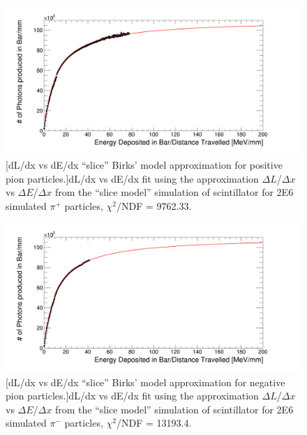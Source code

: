 \begin{figure}[htbp]
 \centering
 \includegraphics[width=\linewidth]{Appendix4/Figs/newNewDldxVsDeDx/pi+DeDxDlDx.png}
 [dL/dx vs dE/dx ``slice'' Birks' model approximation for positive pion particles.]{dL/dx vs dE/dx fit using the approximation $\Delta L$/$\Delta x$ vs $\Delta E$/$\Delta x$ from the ``slice model'' simulation of scintillator for 2E6 simulated $\pi^+$ particles, $\chi^2$/NDF = 9762.33.} 
 \label{fig:slice_APiPlus_dl_dx}
\end{figure}

\begin{figure}[htbp]
 \centering
 \includegraphics[width=\linewidth]{Appendix4/Figs/newNewDldxVsDeDx/pi-DeDxDlDx.png}
 [dL/dx vs dE/dx ``slice'' Birks' model approximation for negative pion particles.]{dL/dx vs dE/dx fit using the approximation $\Delta L$/$\Delta x$ vs $\Delta E$/$\Delta x$ from the ``slice model'' simulation of scintillator for 2E6 simulated $\pi^-$ particles, $\chi^2$/NDF = 13193.4.} 
 \label{fig:slice_APiMinus_dl_dx}
\end{figure}

